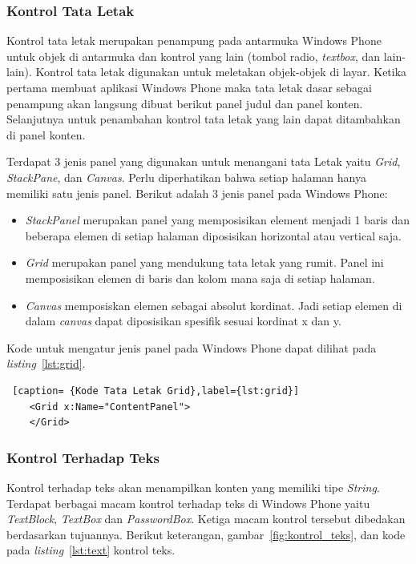 \newpage
\subsubsection{Kontrol Tata Letak}
\label{subsubsec:Kontrol Tata Letak}
\hspace{0.5cm} Kontrol tata letak merupakan penampung pada antarmuka Windows Phone untuk objek di antarmuka dan kontrol yang lain (tombol radio, \textit{textbox}, dan lain-lain). Kontrol tata letak digunakan untuk meletakan objek-objek di layar. Ketika pertama membuat aplikasi Windows Phone maka tata letak dasar sebagai penampung akan langsung dibuat berikut panel judul dan panel konten. Selanjutnya untuk penambahan kontrol tata letak yang lain dapat ditambahkan di panel konten.


Terdapat 3 jenis panel yang digunakan untuk menangani tata Letak yaitu \textit{Grid}, \textit{StackPane}, dan \textit{Canvas}. Perlu diperhatikan bahwa setiap halaman hanya memiliki satu jenis panel. Berikut adalah 3 jenis panel pada Windows Phone:

\begin{itemize}
	\item \textit{StackPanel} merupakan panel yang memposisikan element menjadi 1 baris dan beberapa elemen di setiap halaman diposisikan horizontal atau vertical saja.
	\item \textit{Grid} merupakan panel yang mendukung tata letak yang rumit. Panel ini memposisikan elemen di baris dan kolom mana saja di setiap halaman.
	\item \textit{Canvas} memposiskan elemen sebagai absolut kordinat. Jadi setiap elemen di dalam \textit{canvas} dapat diposisikan spesifik sesuai kordinat x dan y.
\end{itemize}

Kode untuk mengatur jenis panel pada Windows Phone dapat dilihat pada \textit{listing}~\ref{lst:grid}.
\begin{lstlisting} [caption= {Kode Tata Letak Grid},label={lst:grid}]
	<Grid x:Name="ContentPanel">
	</Grid>
\end{lstlisting}
	
\subsubsection{Kontrol Terhadap Teks}
\label{subsubsec:Kontrol Terhadap Teks}
\hspace{0.5cm} Kontrol terhadap teks  akan menampilkan konten yang memiliki tipe \textit{String}. Terdapat berbagai macam kontrol terhadap teks di Windows Phone yaitu \textit{TextBlock}, \textit{TextBox} dan \textit{PasswordBox}. Ketiga macam kontrol tersebut dibedakan berdasarkan tujuannya. Berikut keterangan, gambar~\ref{fig:kontrol_teks}, dan kode pada \textit{listing}~\ref{lst:text} kontrol teks.

